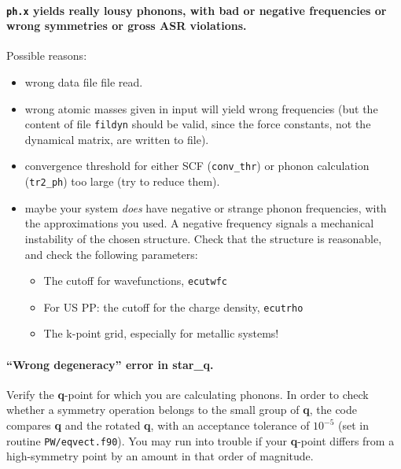 \documentclass[12pt,a4paper]{article}
\begin{document}
\paragraph{\texttt{ph.x} yields really lousy phonons, with bad or
           negative frequencies or wrong symmetries or gross ASR
           violations.}

Possible reasons:
\begin{itemize}
  \item
    wrong data file file read.
  \item
    wrong atomic masses given in input will yield wrong frequencies
    (but the content of file {\tt fildyn} should be valid, since the
    force constants, not the dynamical matrix, are written to file).
  \item
    convergence threshold for either SCF ({\tt conv\_thr}) or phonon
    calculation ({\tt tr2\_ph}) too large (try to reduce them).
  \item
    maybe your system \emph{does} have negative or strange phonon
    frequencies, with the approximations you used.
    A negative frequency signals a mechanical instability of the
    chosen structure.
    Check that the structure is reasonable, and check the following
    parameters:
    \begin{itemize}
      \item The cutoff for wavefunctions, \texttt{ecutwfc}
      \item For US PP: the cutoff for the charge density,
            \texttt{ecutrho}
      \item The k-point grid, especially for metallic systems!
    \end{itemize}
\end{itemize}

\paragraph{``Wrong degeneracy'' error in star\_q.}

Verify the \textbf{q}-point for which you are calculating phonons.
In order to check whether a symmetry operation belongs to the small
group of \textbf{q}, the code compares \textbf{q} and the rotated
\textbf{q}, with an acceptance tolerance of $10^{-5}$ (set in routine
\texttt{PW/eqvect.f90}).
You may run into trouble if your \textbf{q}-point differs from a
high-symmetry point by an amount in that order of magnitude.
\end{document}
